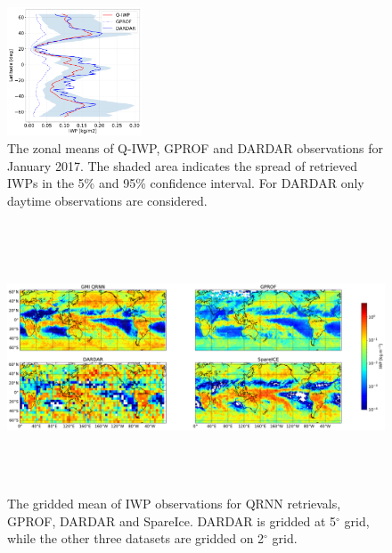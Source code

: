 \documentclass[amt, manuscript]{copernicus}
\begin{document}
\begin{figure}[t]
	\includegraphics[width=4cm]{Figures/zonal_mean_jan_2017.pdf}
	\caption{ The zonal means of Q-IWP, GPROF and DARDAR observations for January 2017. The shaded area indicates the spread of retrieved IWPs in the 5\% and 95\% confidence interval. For DARDAR only daytime observations are considered.  }
	\label{fig:zonal_mean_GMI_17}
\end{figure}


\begin{figure}[t]
	\includegraphics[width=16cm, height = 8cm]{Figures/IWP_spatial_distribution.pdf}
	\caption{ The gridded mean of IWP observations for QRNN retrievals, GPROF, DARDAR and SpareIce. DARDAR is gridded at 5$^\circ$ grid, while the other three datasets are gridded on 2$^\circ$ grid. }
	\label{fig:spatial_dist_GMI}
\end{figure}
\end{document}
